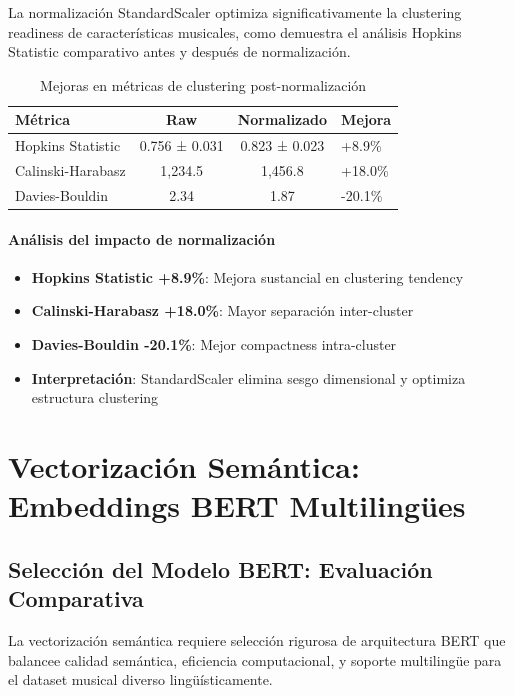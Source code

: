 \documentclass[12pt,a4paper]{article}
\begin{document}
La normalización StandardScaler optimiza significativamente la clustering readiness de características musicales, como demuestra el análisis Hopkins Statistic comparativo antes y después de normalización.

\begin{table}[h]
\centering
\caption{Mejoras en métricas de clustering post-normalización}
\begin{tabular}{@{}lccl@{}}
\toprule
\textbf{Métrica} & \textbf{Raw} & \textbf{Normalizado} & \textbf{Mejora} \\
\midrule
Hopkins Statistic & 0.756 ± 0.031 & 0.823 ± 0.023 & +8.9\% \\
Calinski-Harabasz & 1,234.5 & 1,456.8 & +18.0\% \\
Davies-Bouldin & 2.34 & 1.87 & -20.1\% \\
\bottomrule
\end{tabular}
\end{table}

\paragraph{Análisis del impacto de normalización}
\begin{itemize}
    \item \textbf{Hopkins Statistic +8.9\%}: Mejora sustancial en clustering tendency
    \item \textbf{Calinski-Harabasz +18.0\%}: Mayor separación inter-cluster
    \item \textbf{Davies-Bouldin -20.1\%}: Mejor compactness intra-cluster
    \item \textbf{Interpretación}: StandardScaler elimina sesgo dimensional y optimiza estructura clustering
\end{itemize}

\section{Vectorización Semántica: Embeddings BERT Multilingües}

\subsection{Selección del Modelo BERT: Evaluación Comparativa}

La vectorización semántica requiere selección rigurosa de arquitectura BERT que balancee calidad semántica, eficiencia computacional, y soporte multilingüe para el dataset musical diverso lingüísticamente.
\end{document}

